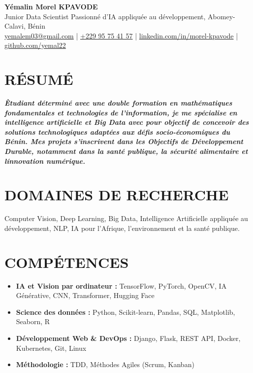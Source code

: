 \documentclass[a4paper,9pt]{extarticle}
\begin{document}
\begin{flushleft}
\textbf{\LARGE Y\'emalin Morel KPAVODE}\\[2pt]
Junior Data Scientist \textendash{} Passionn\'e d\textquoteright{}IA appliqu\'ee au d\'eveloppement, Abomey-Calavi, B\'enin\\
\href{mailto:yemalem03@gmail.com}{yemalem03@gmail.com} | \href{tel:+22995754157}{+229 95 75 41 57} | \href{https://www.linkedin.com/in/morel-kpavode}{linkedin.com/in/morel-kpavode} | \href{https://github.com/yemal22}{github.com/yemal22}
\end{flushleft}

\section*{R\'ESUM\'E}
\noindent
\textit{\small\textbf{\textsf{\`{E}tudiant d\'etermin\'e avec une double formation en math\'ematiques fondamentales et technologies de l'information, je me sp\'ecialise en intelligence artificielle et Big Data avec pour objectif de concevoir des solutions technologiques adapt\'ees aux d\'efis socio-\'economiques du B\'enin. Mes projets s\textquoteright{}inscrivent dans les Objectifs de D\'eveloppement Durable, notamment dans la sant\'e publique, la s\'ecurit\'e alimentaire et l\'innovation num\'erique.}}}

\section*{DOMAINES DE RECHERCHE}
Computer Vision, Deep Learning, Big Data, Intelligence Artificielle appliqu\'ee au d\'eveloppement, NLP, IA pour l'Afrique, l'environnement et la sant\'e publique.

\section*{COMP\'ETENCES}
\begin{itemize}
    \item \textbf{IA et Vision par ordinateur :} TensorFlow, PyTorch, OpenCV, IA G\'en\'erative, CNN, Transformer, Hugging Face
    \item \textbf{Science des donn\'ees :} Python, Scikit-learn, Pandas, SQL, Matplotlib, Seaborn, R
    \item \textbf{D\'eveloppement Web & DevOps :} Django, Flask, REST API, Docker, Kubernetes, Git, Linux
    \item \textbf{Méthodologie :} TDD, Méthodes Agiles (Scrum, Kanban)
\end{itemize}
\end{document}
